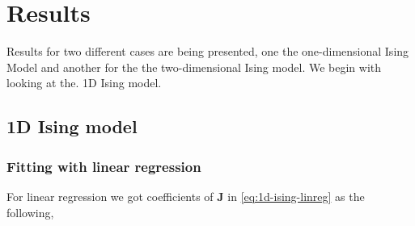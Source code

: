 \section{Results}
Results for two different cases are being presented, one the one-dimensional Ising Model and another for the the two-dimensional Ising model. We begin with looking at the. 1D Ising model.

\subsection{1D Ising model}
\subsubsection{Fitting with linear regression}
For linear regression we got coefficients of $\bm{J}$ in \eqref{eq:1d-ising-linreg} as the following,
